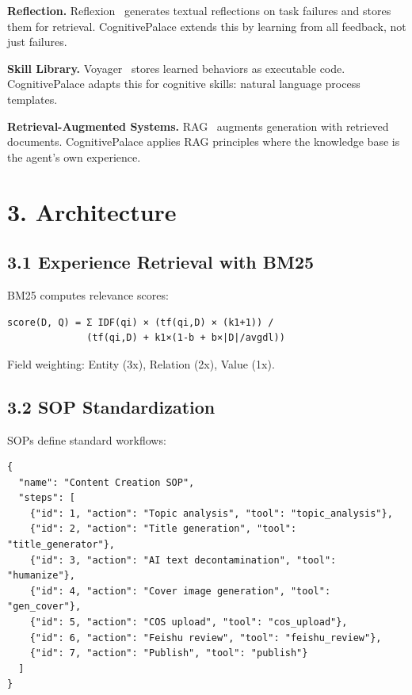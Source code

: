 \documentclass[11pt,a4paper]{article}
\begin{document}
\textbf{Reflection.} Reflexion~\cite{shinn2023reflexion} generates textual reflections on task failures and stores them for retrieval. CognitivePalace extends this by learning from all feedback, not just failures.

\textbf{Skill Library.} Voyager~\cite{wang2023voyager} stores learned behaviors as executable code. CognitivePalace adapts this for cognitive skills: natural language process templates.

\textbf{Retrieval-Augmented Systems.} RAG~\cite{lewis2020rag} augments generation with retrieved documents. CognitivePalace applies RAG principles where the knowledge base is the agent's own experience.

\section{3. Architecture}

\subsection{3.1 Experience Retrieval with BM25}

BM25 computes relevance scores:

\begin{verbatim}
score(D, Q) = Σ IDF(qi) × (tf(qi,D) × (k1+1)) / 
              (tf(qi,D) + k1×(1-b + b×|D|/avgdl))
\end{verbatim}

Field weighting: Entity (3x), Relation (2x), Value (1x).

\subsection{3.2 SOP Standardization}

SOPs define standard workflows:

\begin{verbatim}
{
  "name": "Content Creation SOP",
  "steps": [
    {"id": 1, "action": "Topic analysis", "tool": "topic_analysis"},
    {"id": 2, "action": "Title generation", "tool": "title_generator"},
    {"id": 3, "action": "AI text decontamination", "tool": "humanize"},
    {"id": 4, "action": "Cover image generation", "tool": "gen_cover"},
    {"id": 5, "action": "COS upload", "tool": "cos_upload"},
    {"id": 6, "action": "Feishu review", "tool": "feishu_review"},
    {"id": 7, "action": "Publish", "tool": "publish"}
  ]
}
\end{verbatim}
\end{document}
